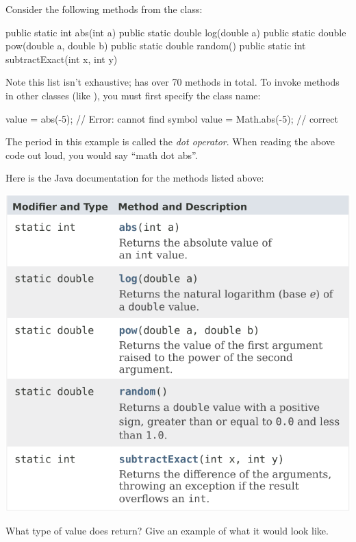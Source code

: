 
Consider the following methods from the  class:

\begin{javalst}
    public static int abs(int a)
    public static double log(double a)
    public static double pow(double a, double b)
    public static double random()
    public static int subtractExact(int x, int y)
\end{javalst}

Note this list isn't exhaustive;  has over 70 methods in total.
To invoke methods in other classes (like ), you must first specify the class name:

\begin{javalst}
    value = abs(-5);       // Error: cannot find symbol
    value = Math.abs(-5);  // correct
\end{javalst}

The period in this example is called the \emph{dot operator}. When reading the above code out loud, you would say ``math dot abs''.

Here is the Java documentation for the methods listed above:
\nopagebreak
\begin{center}
\includegraphics[scale=0.90]{CS1/math-javadoc.pdf}
\end{center}



\Q What type of value does  return? Give an example of what it would look like.

